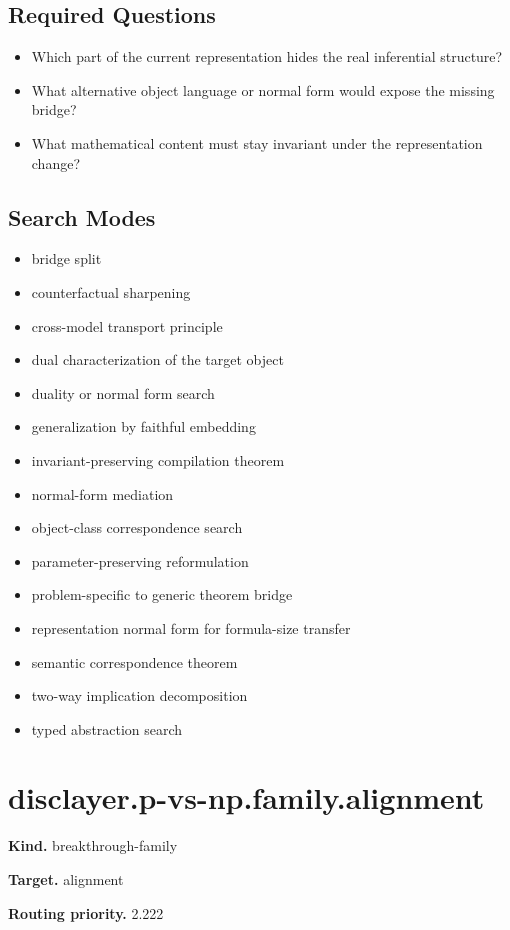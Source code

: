 \documentclass[11pt]{article}
\begin{document}
\subsection*{Required Questions}
\begin{itemize}[leftmargin=*,itemsep=0.2em]
\item Which part of the current representation hides the real inferential structure?
\item What alternative object language or normal form would expose the missing bridge?
\item What mathematical content must stay invariant under the representation change?
\end{itemize}
\subsection*{Search Modes}
\begin{itemize}[leftmargin=*,itemsep=0.2em]
\item bridge split
\item counterfactual sharpening
\item cross-model transport principle
\item dual characterization of the target object
\item duality or normal form search
\item generalization by faithful embedding
\item invariant-preserving compilation theorem
\item normal-form mediation
\item object-class correspondence search
\item parameter-preserving reformulation
\item problem-specific to generic theorem bridge
\item representation normal form for formula-size transfer
\item semantic correspondence theorem
\item two-way implication decomposition
\item typed abstraction search
\end{itemize}
\section{disclayer.p-vs-np.family.alignment}
\textbf{Kind.} breakthrough-family

\textbf{Target.} alignment

\textbf{Routing priority.} 2.222
\end{document}
